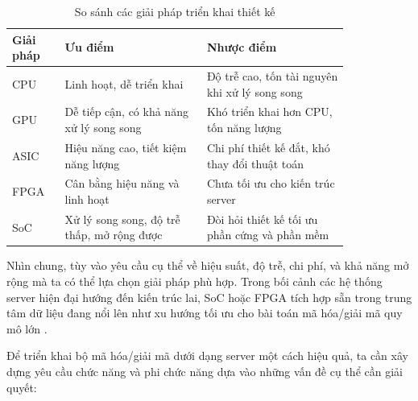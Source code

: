\documentclass[../DoAn.tex]{subfiles}
\begin{document}
\begin{table}[H]
\centering{}
    \caption{So sánh các giải pháp triển khai thiết kế}
    \begin{tabular}{|p{0.13\linewidth} |p{0.35\linewidth}| p{0.35\linewidth}|}
        \hline
        \textbf{Giải pháp} & \textbf{Ưu điểm}  & \textbf{Nhược điểm}\\ \hline\hline
        CPU  & Linh hoạt, dễ triển khai  & Độ trễ cao, tốn tài nguyên khi xử lý song song   \\ \hline
        GPU  & Dễ tiếp cận, có khả năng xử lý song song  & Khó triển khai hơn CPU, tốn năng lượng   \\ \hline
        ASIC   & Hiệu năng cao, tiết kiệm năng lượng   & Chi phí thiết kế đắt, khó thay đổi thuật toán  \\ \hline
        FPGA        & Cân bằng hiệu năng và linh hoạt   & Chưa tối ưu cho kiến trúc server   \\ \hline
        SoC  & Xử lý song song, độ trễ thấp, mở rộng được   & Đòi hỏi thiết kế tối ưu phần cứng và phần mềm  \\ \hline
        \end{tabular}
    \label{table:So sánh các giải pháp triển khai thiết kế}
\end{table}

Nhìn chung, tùy vào yêu cầu cụ thể về hiệu suất, độ trễ, chi phí, và khả năng mở rộng mà ta có thể lựa chọn giải pháp phù hợp. Trong bối cảnh các hệ thống server hiện đại hướng đến kiến trúc lai, SoC hoặc FPGA tích hợp sẵn trong trung tâm dữ liệu đang nổi lên như xu hướng tối ưu cho bài toán mã hóa/giải mã quy mô lớn \cite{noauthor_acceleration_nodate}.

Để triển khai bộ mã hóa/giải mã dưới dạng server một cách hiệu quả, ta cần xây dựng yêu cầu chức năng và phi chức năng dựa vào những vấn đề cụ thể cần giải quyết:
\end{document}
